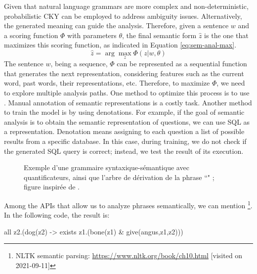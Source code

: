 \documentclass{KBook}
\begin{document}
Given that natural language grammars are more complex and non-deterministic, probabilistic CKY can be employed to address ambiguity issues. Alternatively, the generated meaning can guide the analysis. Therefore, given a sentence \(w\) and a scoring function \(\Phi\) with parameters \(\theta\), the final semantic form \(\hat{z}\) is the one that maximizes this scoring function, as indicated in Equation \ref{eq:sem-anal-max}.
\begin{equation}
\hat{z} = \arg\max_z \Phi(z|w, \theta)
\label{eq:sem-anal-max}
\end{equation}
The sentence \(w\), being a sequence, \(\Phi\) can be represented as a sequential function that generates the next representation, considering features such as the current word, past words, their representations, etc. Therefore, to maximize \(\Phi\), we need to explore multiple analysis paths. One method to optimize this process is to use . Manual annotation of semantic representations is a costly task. Another method to train the model is by using denotations. For example, if the goal of semantic analysis is to obtain the semantic representation of questions, we can use SQL as a representation. Denotation means assigning to each question a list of possible results from a specific database. In this case, during training, we do not check if the generated SQL query is correct; instead, we test the result of its execution.

\begin{figure}[ht]
	\centering
	\caption[Exemple d'une grammaire syntaxique-sémantique avec quantificateurs.]{Exemple d'une grammaire syntaxique-sémantique avec quantificateurs, ainsi que l'arbre de dérivation de la phrase ``" ; figure inspirée de \cite{2018-eisenstein}.}
	\label{fig:regles-sem2}
\end{figure}

Among the APIs that allow us to analyze phrases semantically, we can mention \footnote{NLTK semantic parsing: \url{https://www.nltk.org/book/ch10.html} [visited on 2021-09-11]}. 
In the following code, the result is:
\begin{center}
	all z2.(dog(z2) -> exists z1.(bone(z1) \& give(angus,z1,z2)))
\end{center}
\end{document}
